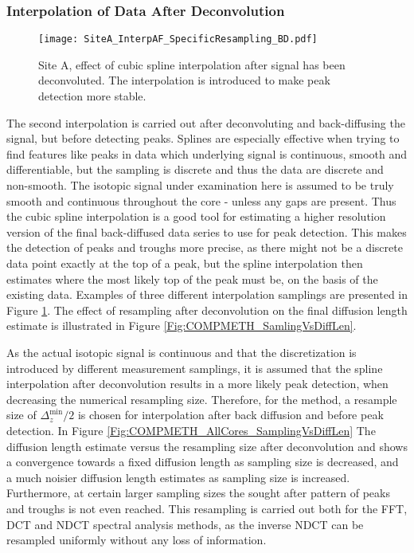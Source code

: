 \documentclass[../../CompleteThesis2/Complete_2ndDraft]{subfiles}
\begin{document}
\subsubsection[Interpolation 2]{Interpolation of Data After Deconvolution}
\label{Subsubsec:METH_Interpolation_AFdecon}
\begin{figure}[!htb]
	\centering
	\texttt{[image: SiteA\_InterpAF\_SpecificResampling\_BD.pdf]}
	\caption[Back diffused dat	a, Site A, different resamplings after deconvolution.]{\small Site A, effect of cubic spline interpolation after signal has been deconvoluted. The interpolation is introduced to make peak detection more stable.}
	\label{Fig:COMPMETH_SiteA_InterpAF_4samplings}
\end{figure}

The second interpolation is carried out after deconvoluting and back-diffusing the signal, but before detecting peaks. Splines are especially effective when trying to find features like peaks in data which underlying signal is continuous, smooth and differentiable, but the sampling is discrete and thus the data are discrete and non-smooth. The isotopic signal under examination here is assumed to be truly smooth and continuous throughout the core - unless any gaps are present. Thus the cubic spline interpolation is a good tool for estimating a higher resolution version of the final back-diffused data series to use for peak detection. This makes the detection of peaks and troughs more precise, as there might not be a discrete data point exactly at the top of a peak, but the spline interpolation then estimates where the most likely top of the peak must be, on the basis of the existing data. Examples of three different interpolation samplings are presented in Figure \ref{Fig:COMPMETH_SiteA_InterpAF_4samplings}. The effect of resampling after deconvolution on the final diffusion length estimate is illustrated in Figure \ref{Fig:COMPMETH_SamlingVsDiffLen}. 

As the actual isotopic signal is continuous and that the discretization is introduced by different measurement samplings, it is assumed that the spline interpolation after deconvolution results in a more likely peak detection, when decreasing the numerical resampling size. Therefore, for the method, a resample size of $\Delta_z^{\text{min}}/2$ is chosen for interpolation after back diffusion and before peak detection. In Figure \ref{Fig:COMPMETH_AllCores_SamplingVsDiffLen} The diffusion length estimate versus the resampling size after deconvolution and shows a convergence towards a fixed diffusion length as sampling size is decreased, and a much noisier diffusion length estimates as sampling size is increased. Furthermore, at certain larger sampling sizes the sought after pattern of peaks and troughs is not even reached. This resampling is carried out both for the FFT, DCT and NDCT spectral analysis methods, as the inverse NDCT can be resampled uniformly without any loss of information.
\end{document}
